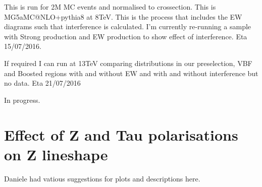 This is run for 2M MC events and normalised to crossection. This is MG5aMC@NLO+pythia8 at 8TeV. This is the process that includes the EW diagrams such that interference is calculated. I'm currently re-running a sample with Strong production and EW production to show effect of interference. Eta 15/07/2016.

If required I can run at 13TeV comparing distributions in our preselection, VBF and Boosted regions with and without EW and with and without interference but no data. Eta 21/07/2016

In progress. 

\section{Effect of Z and Tau polarisations on Z lineshape}
Daniele had vatious suggestions for plots and descriptions here. 